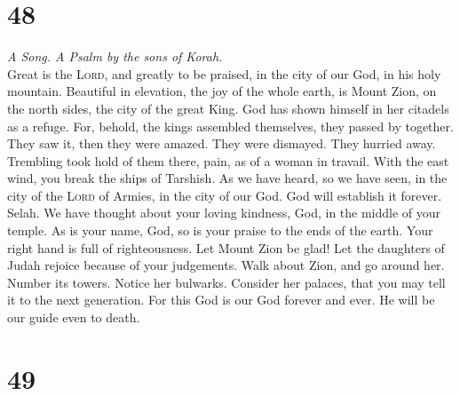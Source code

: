 \hypertarget{section-47}{%
\section{48}\label{section-47}}

\emph{A Song. A Psalm by the sons of Korah.}\\
 Great is the \textsc{Lord}, and greatly to be praised, in
the city of our God, in his holy mountain.  Beautiful in
elevation, the joy of the whole earth, is Mount Zion, on the north
sides, the city of the great King.  God has shown himself
in her citadels as a refuge.  For, behold, the kings
assembled themselves, they passed by together.  They saw
it, then they were amazed. They were dismayed. They hurried away.
 Trembling took hold of them there, pain, as of a woman in
travail.  With the east wind, you break the ships of
Tarshish.  As we have heard, so we have seen, in the city
of the \textsc{Lord} of Armies, in the city of our God. God will
establish it forever. Selah.  We have thought about your
loving kindness, God, in the middle of your temple.  As
is your name, God, so is your praise to the ends of the earth. Your
right hand is full of righteousness.  Let Mount Zion be
glad! Let the daughters of Judah rejoice because of your judgements.
 Walk about Zion, and go around her. Number its towers.
 Notice her bulwarks. Consider her palaces, that you may
tell it to the next generation.  For this God is our God
forever and ever. He will be our guide even to death.

\hypertarget{section-48}{%
\section{49}\label{section-48}}

